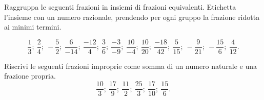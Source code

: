 
\begin{esercizio}
 \label{ese:3.17}
Raggruppa le seguenti frazioni in insiemi di frazioni equivalenti.
Etichetta l'insieme con un numero razionale, prendendo per ogni gruppo la 
frazione ridotta ai minimi termini.

\[\frac{1}{3};~\frac{2}{4};~-\frac{5}{2};~\frac{6}{-14};~\frac{-12}{4};~
\frac{3}{6};~\frac{-3}{-9};~
\frac{10}{-4};~\frac{10}{20};~\frac{-18}{42};~\frac{5}{15};~
-\frac{9}{21};~-\frac{15}{6};~\frac{4}{12}.\]
\end{esercizio}

\begin{esercizio}
 \label{ese:3.18}
 Riscrivi le seguenti frazioni improprie come somma di un numero naturale e 
 una frazione propria.
\[\frac{10}{3};~\frac{17}{9};~\frac{11}{2};~\frac{25}{3};~\frac{17}{10};~
\frac{15}{6}.\]
\end{esercizio}


